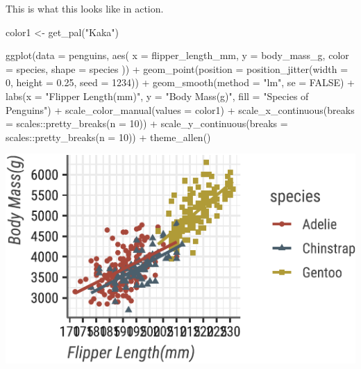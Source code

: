 \documentclass[]{tufte-handout}
\newenvironment{Shaded}{}{}
\newcommand{\AttributeTok}[1]{\textcolor[rgb]{0.49,0.56,0.16}{#1}}
\newcommand{\ConstantTok}[1]{\textcolor[rgb]{0.53,0.00,0.00}{#1}}
\newcommand{\DecValTok}[1]{\textcolor[rgb]{0.25,0.63,0.44}{#1}}
\newcommand{\FloatTok}[1]{\textcolor[rgb]{0.25,0.63,0.44}{#1}}
\newcommand{\FunctionTok}[1]{\textcolor[rgb]{0.02,0.16,0.49}{#1}}
\newcommand{\NormalTok}[1]{#1}
\newcommand{\OtherTok}[1]{\textcolor[rgb]{0.00,0.44,0.13}{#1}}
\newcommand{\SpecialCharTok}[1]{\textcolor[rgb]{0.25,0.44,0.63}{#1}}
\newcommand{\StringTok}[1]{\textcolor[rgb]{0.25,0.44,0.63}{#1}}
\begin{document}
This is what this looks like in action.

\begin{Shaded}
\begin{Highlighting}[]
\NormalTok{color1 }\OtherTok{\textless{}{-}} \FunctionTok{get\_pal}\NormalTok{(}\StringTok{"Kaka"}\NormalTok{)}

\FunctionTok{ggplot}\NormalTok{(}\AttributeTok{data =}\NormalTok{ penguins, }\FunctionTok{aes}\NormalTok{(}
  \AttributeTok{x =}\NormalTok{ flipper\_length\_mm, }\AttributeTok{y =}\NormalTok{ body\_mass\_g, }\AttributeTok{color =}\NormalTok{ species,}
  \AttributeTok{shape =}\NormalTok{ species}
\NormalTok{)) }\SpecialCharTok{+}
  \FunctionTok{geom\_point}\NormalTok{(}\AttributeTok{position =} \FunctionTok{position\_jitter}\NormalTok{(}\AttributeTok{width =} \DecValTok{0}\NormalTok{, }\AttributeTok{height =} \FloatTok{0.25}\NormalTok{, }\AttributeTok{seed =} \DecValTok{1234}\NormalTok{)) }\SpecialCharTok{+}
  \FunctionTok{geom\_smooth}\NormalTok{(}\AttributeTok{method =} \StringTok{"lm"}\NormalTok{, }\AttributeTok{se =} \ConstantTok{FALSE}\NormalTok{) }\SpecialCharTok{+}
  \FunctionTok{labs}\NormalTok{(}\AttributeTok{x =} \StringTok{"Flipper Length(mm)"}\NormalTok{, }\AttributeTok{y =} \StringTok{"Body Mass(g)"}\NormalTok{, }\AttributeTok{fill =} \StringTok{"Species of Penguins"}\NormalTok{) }\SpecialCharTok{+}
  \FunctionTok{scale\_color\_manual}\NormalTok{(}\AttributeTok{values =}\NormalTok{ color1) }\SpecialCharTok{+}
  \FunctionTok{scale\_x\_continuous}\NormalTok{(}\AttributeTok{breaks =}\NormalTok{ scales}\SpecialCharTok{::}\FunctionTok{pretty\_breaks}\NormalTok{(}\AttributeTok{n =} \DecValTok{10}\NormalTok{)) }\SpecialCharTok{+}
  \FunctionTok{scale\_y\_continuous}\NormalTok{(}\AttributeTok{breaks =}\NormalTok{ scales}\SpecialCharTok{::}\FunctionTok{pretty\_breaks}\NormalTok{(}\AttributeTok{n =} \DecValTok{10}\NormalTok{)) }\SpecialCharTok{+}
  \FunctionTok{theme\_allen}\NormalTok{()}
\end{Highlighting}
\end{Shaded}

\begin{center}\includegraphics{R-Guide_files/figure-latex/multiplot-1} \end{center}
\end{document}
